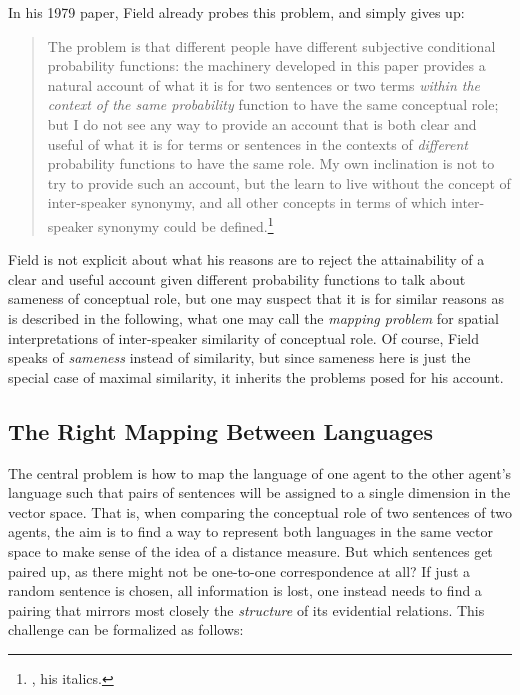 \documentclass[11pt, a4paper]{scrartcl}
\renewcommand{\i}[1]{\emph{#1}}
\begin{document}
In his 1979 paper, Field already probes this problem, and simply gives up:

{\singlespacing{} 
\begin{quote}
  The problem is that different people have different subjective
 conditional probability functions: the machinery developed in this
 paper provides a natural account of what it is for two sentences or
 two terms \i{within the context of the same probability} function to have
 the same conceptual role; but I do not see any way to provide an
 account that is both clear and useful of what it is for terms or sentences in the contexts of \i{different} probability functions to have the
 same role. My own inclination is not to try to provide such an
 account, but the learn to live without the concept of inter-speaker
 synonymy, and all other concepts in terms of which inter-speaker
 synonymy could be defined.\footnote{\textcite[398]{Field1977}, his italics.} 
 \end{quote}
}

 Field is not explicit about what his reasons are to reject the attainability of a clear and useful account given different probability functions to talk about sameness of conceptual role, but one may suspect that it is for similar reasons as is described in the following, what one may call the \i{mapping problem} for spatial interpretations of inter-speaker similarity of conceptual role. Of course, Field speaks of \i{sameness} instead of similarity, but since sameness here is just the special case of maximal similarity, it inherits the problems posed for his account.  

\subsection{The Right Mapping Between Languages}

The central problem is how to map the language of one agent to the other agent's language such that pairs of sentences will be assigned to a single dimension in the vector space. That is, when comparing the conceptual role of two sentences of two agents, the aim is to find a way to represent both languages in the same vector space to make sense of the idea of a distance measure. But which sentences get paired up, as there might not be one-to-one correspondence at all? If just a random sentence is chosen, all information is lost, one instead needs to find a pairing that mirrors most closely the \i{structure} of its evidential relations. This challenge can be formalized as follows:
\end{document}
